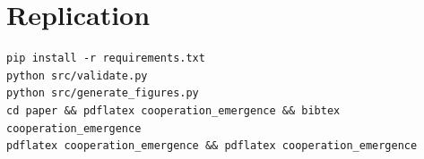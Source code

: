 \documentclass[11pt,a4paper]{article}
\begin{document}
\section*{Replication}

\begin{verbatim}
pip install -r requirements.txt
python src/validate.py
python src/generate_figures.py
cd paper && pdflatex cooperation_emergence && bibtex cooperation_emergence
pdflatex cooperation_emergence && pdflatex cooperation_emergence
\end{verbatim}



\end{document}
